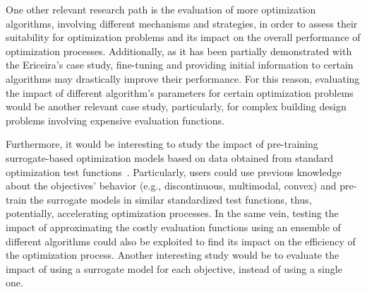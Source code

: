 One other relevant research path is the evaluation of more optimization algorithms, involving different mechanisms and strategies, in order to assess their suitability for optimization problems and its impact on the overall performance of optimization processes. Additionally, as it has been partially demonstrated with the Ericeira's case study, fine-tuning and providing initial information to certain algorithms may drastically improve their performance. For this reason, evaluating the impact of different algorithm's parameters for certain optimization problems would be another relevant case study, particularly, for complex building design problems involving expensive evaluation functions. 

Furthermore, it would be interesting to study the impact of pre-training surrogate-based optimization models based on data obtained from standard optimization test functions~\cite{Zhang2009TEST}. Particularly, users could use previous knowledge about the objectives' behavior (e.g., discontinuous, multimodal, convex) and pre-train the surrogate models in similar standardized test functions, thus, potentially, accelerating optimization processes. In the same vein, testing the impact of approximating the costly evaluation functions using an ensemble of different algorithms could also be exploited to find its impact on the efficiency of the optimization process. %
Another interesting study would be to evaluate the impact of using a surrogate model for each objective, instead of using a single one. 

